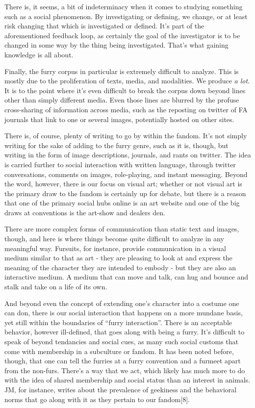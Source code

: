 There is, it seems, a bit of indeterminacy when it comes to studying
something such as a social phenomenon. By investigating or defining, we
change, or at least risk changing that which is investigated or defined.
It's part of the aforementioned feedback loop, as certainly the goal of
the investigator is to be changed in some way by the thing being
investigated. That's what gaining knowledge is all about.

Finally, the furry corpus in particular is extremely difficult to
analyze. This is mostly due to the proliferation of texts, media, and
modalities. We produce \emph{a lot}. It is to the point where it's even
difficult to break the corpus down beyond lines other than simply
different media. Even those lines are blurred by the profuse
cross-sharing of information across media, such as the reposting on
twitter of FA journals that link to one or several images, potentially
hosted on other sites.

There is, of course, plenty of writing to go by within the fandom. It's
not simply writing for the sake of adding to the furry genre, such as it
is, though, but writing in the form of image descriptions, journals, and
rants on twitter. The idea is carried further to social interaction with
written language, through twitter conversations, comments on images,
role-playing, and instant messaging. Beyond the word, however, there is
our focus on visual art; whether or not visual art is the primary draw
to the fandom is certainly up for debate, but there is a reason that one
of the primary social hubs online is an art website and one of the big
draws at conventions is the art-show and dealers den.

There are more complex forms of communication than static text and
images, though, and here is where things become quite difficult to
analyze in any meaningful way. Fursuits, for instance, provide
communication in a visual medium similar to that as art - they are
pleasing to look at and express the meaning of the character they are
intended to embody - but they are also an interactive medium. A medium
that can move and talk, can hug and bounce and stalk and take on a life
of its own.

And beyond even the concept of extending one's character into a costume
one can don, there is our social interaction that happens on a more
mundane basis, yet still within the boundaries of ``furry interaction''.
There is an acceptable behavior, however ill-defined, that goes along
with being a furry. It's difficult to speak of beyond tendancies and
social cues, as many such social customs that come with membership in a
subculture or fandom. It has been noted before, though, that one can
tell the furries at a furry convention and a furmeet apart from the
non-furs. There's a way that we act, which likely has much more to do
with the idea of shared membership and social status than an interest in
animals. JM, for instance, writes about the prevalence of geekiness and
the behavioral norms that go along with it as they pertain to our
fandom{[}8{]}.

